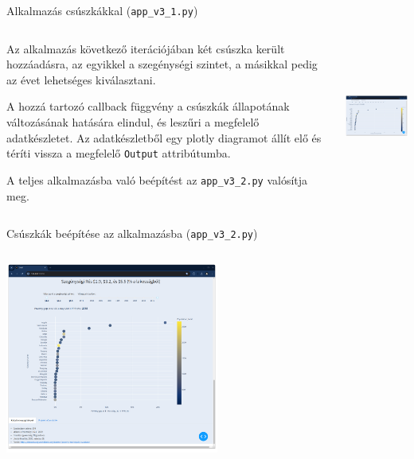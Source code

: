 \documentclass[english, aspectratio=169]{beamer}
\begin{document}
	\begin{frame}{Alkalmazás csúszkákkal (\texttt{app\_v3\_1.py})}
		\begin{columns}
			\begin{column}{.5\textwidth}
				Az alkalmazás következő iterációjában két csúszka került hozzáadásra, az egyikkel a szegénységi szintet, a másikkal pedig az évet lehetséges kiválasztani.\par\medskip
				A hozzá tartozó callback függvény a csúszkák állapotának változásának hatására elindul, és leszűri a megfelelő adatkészletet. Az adatkészletből egy plotly diagramot állít elő és téríti vissza a megfelelő \texttt{Output} attribútumba.\par\medskip
				A teljes alkalmazásba való beépítést az \texttt{app\_v3\_2.py} valósítja meg.
			\end{column}
			\begin{column}{.5\textwidth}
				\begin{center}
					\includegraphics[width=7cm, height=5cm]{images/scatter_19.png}
				\end{center}		
			\end{column}
		\end{columns}
	\end{frame}
	
	\begin{frame}{Csúszkák beépítése az alkalmazásba (\texttt{app\_v3\_2.py})}
		\begin{center}
			\includegraphics[width=7cm, height=7cm, keepaspectratio]{images/scatter_34.png}
		\end{center}
	\end{frame}
	
\end{document}
